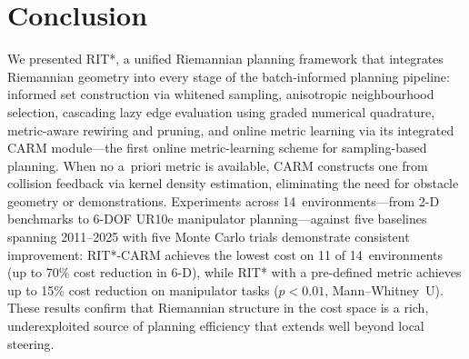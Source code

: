 \documentclass[journal]{IEEEtran}
\begin{document}
\section{Conclusion}\label{sec:conclusion}

We presented RIT*, a unified Riemannian planning framework that
integrates Riemannian geometry into every stage of the batch-informed
planning pipeline: informed set construction via whitened sampling,
anisotropic neighbourhood selection, cascading lazy edge evaluation
using graded numerical quadrature, metric-aware rewiring and pruning,
and online metric learning via its integrated CARM module---the first
online metric-learning scheme for sampling-based planning. When no
a~priori metric is available, CARM constructs one from collision
feedback via kernel density estimation, eliminating the need for
obstacle geometry or demonstrations.
Experiments across 14~environments---from 2-D benchmarks to
6-DOF UR10e manipulator planning---against five baselines spanning
2011--2025 with five Monte Carlo trials demonstrate consistent
improvement: RIT*-CARM achieves the lowest cost on 11 of
14~environments (up to 70\% cost reduction in 6-D), while RIT* with a
pre-defined metric achieves up to 15\% cost reduction on manipulator
tasks ($p < 0.01$, Mann--Whitney~U).
These results confirm that
Riemannian structure in the cost space is a rich, underexploited source
of planning efficiency that extends well beyond local steering.
\end{document}
